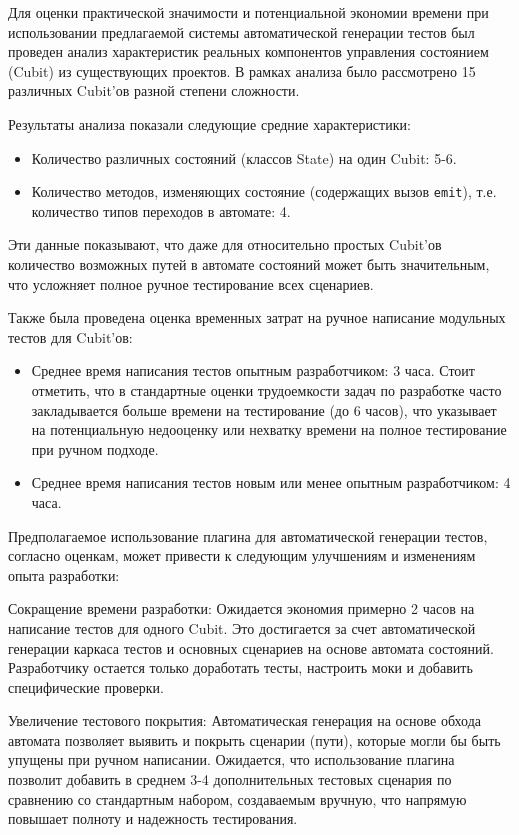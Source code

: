 \documentclass[14pt, russian]{scrartcl}
\begin{document}
Для оценки практической значимости и потенциальной экономии времени при использовании предлагаемой системы автоматической генерации тестов был проведен анализ характеристик реальных компонентов управления состоянием (Cubit) из существующих проектов. В рамках анализа было рассмотрено 15 различных Cubit'ов разной степени сложности.

Результаты анализа показали следующие средние характеристики:
\begin{itemize}
    \item Количество различных состояний (классов State) на один Cubit: 5-6.
    \item Количество методов, изменяющих состояние (содержащих вызов \texttt{emit}), т.е. количество типов переходов в автомате: 4.
\end{itemize}

Эти данные показывают, что даже для относительно простых Cubit'ов количество возможных путей в автомате состояний может быть значительным, что усложняет полное ручное тестирование всех сценариев.

Также была проведена оценка временных затрат на ручное написание модульных тестов для Cubit'ов:
\begin{itemize}
    \item Среднее время написания тестов опытным разработчиком: 3 часа. Стоит отметить, что в стандартные оценки трудоемкости задач по разработке часто закладывается больше времени на тестирование (до 6 часов), что указывает на потенциальную недооценку или нехватку времени на полное тестирование при ручном подходе.
    \item Среднее время написания тестов новым или менее опытным разработчиком: 4 часа.
\end{itemize}

Предполагаемое использование плагина для автоматической генерации тестов, согласно оценкам, может привести к следующим улучшениям и изменениям опыта разработки:
\begin{itemize*}
    \item {Сокращение времени разработки:} Ожидается экономия примерно 2 часов на написание тестов для одного Cubit. Это достигается за счет автоматической генерации каркаса тестов и основных сценариев на основе автомата состояний. Разработчику остается только доработать тесты, настроить моки и добавить специфические проверки.
    \item {Увеличение тестового покрытия:} Автоматическая генерация на основе обхода автомата позволяет выявить и покрыть сценарии (пути), которые могли бы быть упущены при ручном написании. Ожидается, что использование плагина позволит добавить в среднем 3-4 дополнительных тестовых сценария по сравнению со стандартным набором, создаваемым вручную, что напрямую повышает полноту и надежность тестирования.
\end{itemize*}
\end{document}
